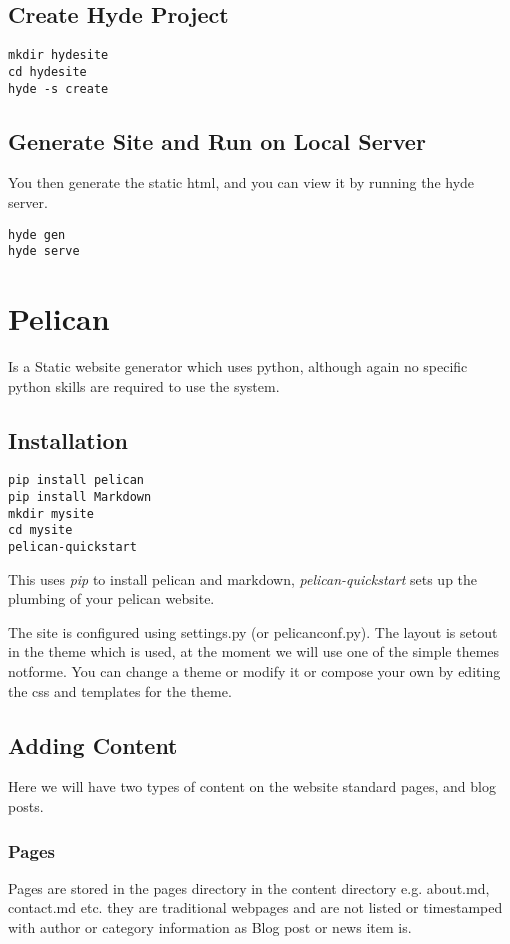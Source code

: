 \documentclass[12pt]{article}			%
\begin{document}
\subsection{Create Hyde Project}
\begin{verbatim}
mkdir hydesite
cd hydesite
hyde -s create

\end{verbatim}

\subsection{Generate Site and Run on Local Server}
You then generate the static html, and you can view it by running the hyde server.
\begin{verbatim}
hyde gen
hyde serve
\end{verbatim}

\newpage
\section{Pelican}
Is a Static website generator which uses python, although again no specific python skills are required to use the system.
\subsection{Installation}
\begin{verbatim}
pip install pelican
pip install Markdown
mkdir mysite
cd mysite
pelican-quickstart
\end{verbatim}
This uses \textit{pip} to install pelican and markdown, \textit{pelican-quickstart} sets up the plumbing of your pelican website.\par
The site is configured using settings.py (or pelicanconf.py).
The layout is setout in the theme which is used, at the moment we will use one of the simple themes notforme. You can change a theme or modify it or compose your own by editing the css and templates for the theme.
\subsection{Adding Content}
Here we will have two types of content on the website standard pages, and blog posts.
\subsubsection{Pages}
Pages are stored in the pages directory in the content directory e.g. about.md, contact.md etc. they are traditional webpages and are not listed or timestamped with author or category information as Blog post or news item is.
\end{document}
